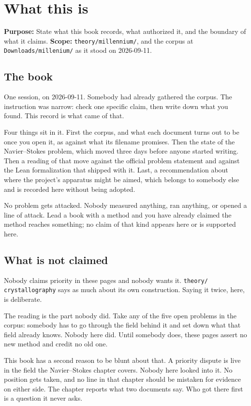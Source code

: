 \chapter{What this is}

\textbf{Purpose:} State what this book records, what authorized it, and the boundary of what it
claims. \textbf{Scope:} \texttt{theory/\allowbreak{}millennium/\allowbreak{}}, and the corpus at
\texttt{Downloads/\allowbreak{}millenium/\allowbreak{}} as it stood on 2026-09-11.

\section{The book}

One session, on 2026-09-11. Somebody had already gathered the corpus. The instruction was narrow:
check one specific claim, then write down what you found. This record is what came of that.

Four things sit in it. First the corpus, and what each document turns out to be once you open it,
as against what its filename promises. Then the state of the Navier--Stokes problem, which moved
three days before anyone started writing. Then a reading of that move against the official problem
statement and against the Lean formalization that shipped with it. Last, a recommendation about
where the project's apparatus might be aimed, which belongs to somebody else and is recorded here
without being adopted.

No problem gets attacked. Nobody measured anything, ran anything, or opened a line of attack. Lead
a book with a method and you have already claimed the method reaches something; no claim of that
kind appears here or is supported here.

\section{What is not claimed}

Nobody claims priority in these pages and nobody wants it. \texttt{theory/\allowbreak{}%
crystallography} says as much about its own construction. Saying it twice, here, is deliberate.

The reading is the part nobody did. Take any of the five open problems in the corpus: somebody has to
go through the field behind it and set down what that field already knows. Nobody here did. Until
somebody does, these pages assert no new method and credit no old one.

This book has a second reason to be blunt about that. A priority dispute is live in the field the
Navier--Stokes chapter covers. Nobody here looked into it. No position gets taken, and no line in
that chapter should be mistaken for evidence on either side. The chapter reports what two documents
say. Who got there first is a question it never asks.

